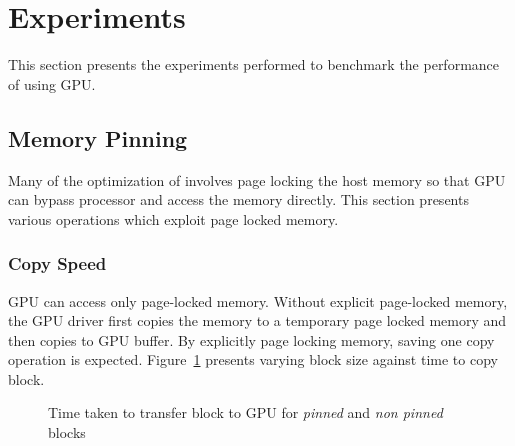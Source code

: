 \section{Experiments}
This section presents the experiments performed to benchmark the performance of
using GPU.
\subsection{Memory Pinning}
Many of the optimization of involves page locking the host memory so that GPU can
bypass processor and access the memory directly. This section presents various
operations which exploit page locked memory.
\subsubsection{Copy Speed}
GPU can access only page-locked memory. Without explicit page-locked memory, the
GPU driver first copies the memory to a temporary page locked memory and then copies
to GPU buffer. By explicitly page locking memory, saving one copy operation is expected.
Figure~\ref{fig:mempin_block_copy} presents varying block size against time to
copy block.

\begin{figure}[h]
  
  \caption{Time taken to transfer block to GPU for \textit{pinned} and \textit{non pinned} blocks}
  \label{fig:mempin_block_copy}
\end{figure}

